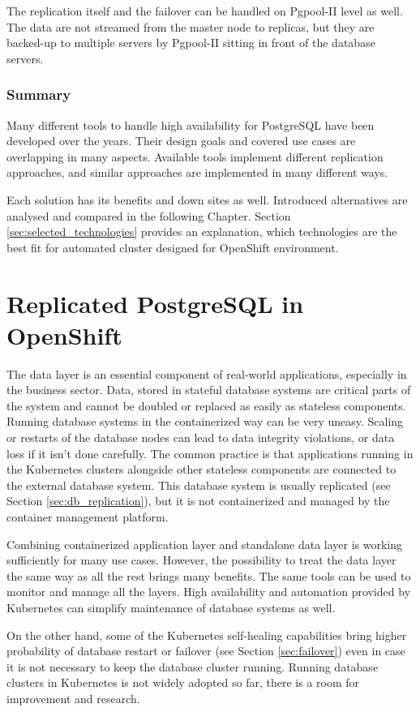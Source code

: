 \documentclass[
  digital, %
  twoside, %
  table,   %
  lof,     %
  lot,     %
]{fithesis3}
\begin{document}
The replication itself and the failover can be handled on Pgpool-II level as well. The data are not streamed from the master node to replicas, but they are backed-up to multiple servers by Pgpool-II sitting in front of the database servers.

\subsection{Summary}
Many different tools to handle high availability for PostgreSQL have been developed over the years. Their design goals and covered use cases are overlapping in many aspects. Available tools implement different replication approaches, and similar approaches are implemented in many different ways.

Each solution has its benefits and down sites as well. Introduced alternatives are analysed and compared in the following Chapter. Section \ref{sec:selected_technologies} provides an explanation, which technologies are the best fit for automated cluster designed for OpenShift environment.


\chapter{Replicated PostgreSQL in OpenShift} \label{chap:pg_in_openshift}
The data layer is an essential component of real-world applications, especially in the business sector. Data, stored in stateful database systems are critical parts of the system and cannot be doubled or replaced as easily as stateless components. Running database systems in the containerized way can be very uneasy. Scaling or restarts of the database nodes can lead to data integrity violations, or data loss if it isn't done carefully. The common practice is that applications running in the Kubernetes clusters alongside other stateless components are connected to the external database system. This database system is usually replicated (see Section \ref{sec:db_replication}), but it is not containerized and managed by the container management platform.

Combining containerized application layer and standalone data layer is working sufficiently for many use cases. However, the possibility to treat the data layer the same way as all the rest brings many benefits. The same tools can be used to monitor and manage all the layers. High availability and automation provided by Kubernetes can simplify maintenance of database systems as well.

On the other hand, some of the Kubernetes self-healing capabilities bring higher probability of database restart or failover (see Section \ref{sec:failover}) even in case it is not necessary to keep the database cluster running. Running database clusters in Kubernetes is not widely adopted so far, there is a room for improvement and research.
\end{document}
